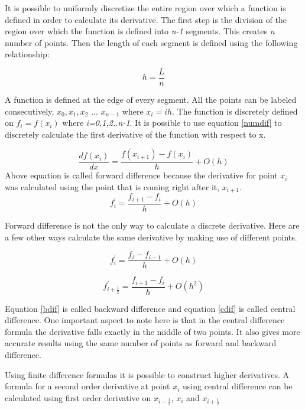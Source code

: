 \begin{doublespace}
It is possible to uniformly discretize the entire region over which a function is defined in order to calculate its derivative. The first step is the division of the region over which the function is defined into \textit{n-1} segments. This creates \textit{n} number of points. Then the length of each segment is defined using the following relationship:

\begin{equation}
h=\frac{L}{n}
\end{equation}

A function is defined at the edge of every segment. All the points can be labeled consecutively, $x_0,x_1,x_2$ ... $x_{n-1}$ where $x_i=ih$. The function is discretely defined on \textit{$f_{i}=f(x_{i})$} where\textit{ i=0,1,2..n-1}. It is possible to use equation  \ref{numdif} to discretely calculate the first derivative of the function with respect to x.

\begin{equation}
\frac{df(x_i)}{dx}=\frac{f(x_{i+1})-f(x_i)}{h} + O(h)
\end{equation}
Above equation is called forward difference because the derivative for point $x_i$ was calculated using the point that is coming right after it, $x_{i+1}$.
\begin{equation}
f^{'}_i=\frac{f_{i+1}-f_i}{h}+ O(h)
\end{equation}

Forward difference is not the only way to calculate a discrete derivative. Here are a few other ways calculate the same derivative by making use of different points.

\begin{equation}
f^{'}_i=\frac{f_{i}-f_{i-1}}{h}+ O(h)
\label{bdif}
\end{equation}

\begin{equation}
f^{'}_{i+\frac{1}{2}}=\frac{f_{i+1}-f_i}{h}+ O(h^2)
\label{cdif}
\end{equation}

Equation \ref{bdif} is called backward difference and equation \ref{cdif} is called central difference. One important aspect to note here is that in the central difference formula the derivative falls exactly in the middle of two points. It also gives more accurate results using the same number of points as forward and backward difference. 

Using finite difference formulas it is possible to construct higher derivatives. A formula for a second order derivative at point $x_i$ using central difference can be calculated using first order derivative on $x_{i-\frac{1}{2}}$, $x_i$ and $x_{i+\frac{1}{2}}$  


\end{doublespace}
